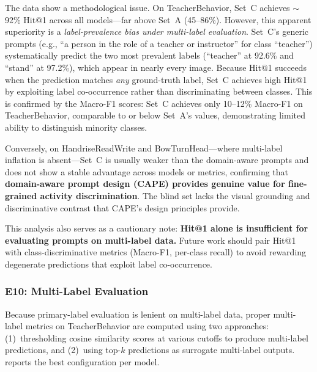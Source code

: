 \documentclass[electronics,article,submit,pdftex,moreauthors]{Definitions/mdpi}
\begin{document}
The data show a methodological issue. On TeacherBehavior, Set~C achieves $\sim$92\% Hit@1 across all models---far above Set~A (45--86\%). However, this apparent superiority is a \emph{label-prevalence bias under multi-label evaluation}. Set~C's generic prompts (e.g., ``a person in the role of a teacher or instructor'' for class ``teacher'') systematically predict the two most prevalent labels (``teacher'' at 92.6\% and ``stand'' at 97.2\%), which appear in nearly every image. Because Hit@1 succeeds when the prediction matches \emph{any} ground-truth label, Set~C achieves high Hit@1 by exploiting label co-occurrence rather than discriminating between classes. This is confirmed by the Macro-F1 scores: Set~C achieves only 10--12\% Macro-F1 on TeacherBehavior, comparable to or below Set~A's values, demonstrating limited ability to distinguish minority classes.

Conversely, on HandriseReadWrite and BowTurnHead---where multi-label inflation is absent---Set~C is usually weaker than the domain-aware prompts and does not show a stable advantage across models or metrics, confirming that \textbf{domain-aware prompt design (CAPE) provides genuine value for fine-grained activity discrimination}. The blind set lacks the visual grounding and discriminative contrast that CAPE's design principles provide.

This analysis also serves as a cautionary note: \textbf{Hit@1 alone is insufficient for evaluating prompts on multi-label data.} Future work should pair Hit@1 with class-discriminative metrics (Macro-F1, per-class recall) to avoid rewarding degenerate predictions that exploit label co-occurrence.


\subsubsection{E10: Multi-Label Evaluation}
\label{sec:e10_multilabel}

Because primary-label evaluation is lenient on multi-label data, proper multi-label metrics on TeacherBehavior are computed using two approaches: (1)~thresholding cosine similarity scores at various cutoffs to produce multi-label predictions, and (2)~using top-$k$ predictions as surrogate multi-label outputs.  reports the best configuration per model.
\end{document}
